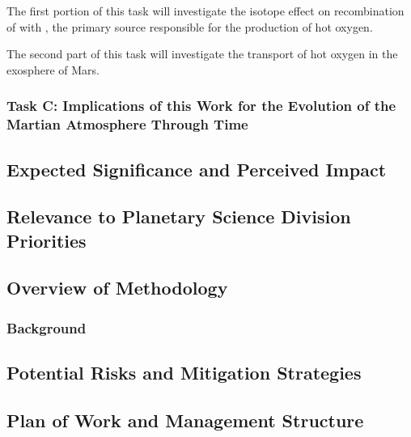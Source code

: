 \documentclass[oneside,12pt]{article}
\begin{document}
    The first portion of this task will investigate the isotope effect on recombination of  with , the primary source responsible
    for the production of hot oxygen.

    The second part of this task will investigate the transport of hot oxygen in the exosphere of Mars.


    \subsubsection{Task C: Implications of this Work for the Evolution of the Martian Atmosphere Through Time}



    \subsection{Expected Significance and Perceived Impact}



    \subsection{Relevance to Planetary Science Division Priorities}



    \subsection{Overview of Methodology}
    \label{sec:methodology}



    \subsubsection{Background}



    \subsection{Potential Risks and Mitigation Strategies}



    \subsection{Plan of Work and Management Structure}


    \clearpage


\end{document}
